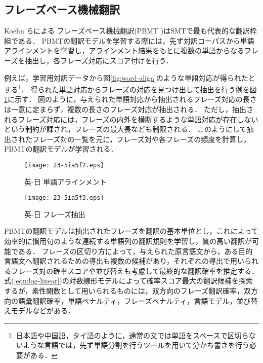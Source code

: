 \documentclass[japanese]{jnlp_1.4}
\begin{document}
\subsection{フレーズベース機械翻訳}
\label{sec:pbmt}

Koehn らによる フレーズベース機械翻訳(PBMT \cite{koehn03})はSMTで最も代表的な翻訳枠組である．
PBMTの翻訳モデルを学習する際には，先ず対訳コーパスから単語アラインメント\cite{brown93}を学習し，アラインメント結果をもとに複数の単語からなるフレーズを抽出し，各フレーズ対応にスコア付けを行う．

例えば，学習用対訳データから図\ref{fig:word-align}のような単語対応が得られたとする\footnote{日本語や中国語，タイ語のように，通常の文では単語をスペースで区切らないような言語では，先ず単語分割を行うツールを用いて分かち書きを行う必要がある．}．
得られた単語対応からフレーズの対応を見つけ出して抽出を行う例を図\ref{fig:phrase-extraction}に示す．
図のように，与えられた単語対応から抽出されるフレーズ対応の長さは一意に定まらず，複数の長さのフレーズ対応が抽出される．
ただし，抽出されるフレーズ対応には，フレーズの内外を横断するような単語対応が存在しないという制約が課され，フレーズの最大長なども制限される．
このようにして抽出されたフレーズ対の一覧を元に，フレーズ対や各フレーズの頻度を計算し，PBMTの翻訳モデルが学習される．

\begin{figure}[b]
\begin{minipage}[b]{0.45\hsize}
\begin{center}
\texttt{[image: 23-5ia5f2.eps]}
\end{center}
\caption{英-日 単語アラインメント}
\label{fig:word-align}
\end{minipage}
\hfill
\begin{minipage}[b]{0.45\hsize}
\begin{center}
\texttt{[image: 23-5ia5f3.eps]}
\end{center}
\caption{英-日 フレーズ抽出}
\label{fig:phrase-extraction}
\end{minipage}
\end{figure}

PBMTの翻訳モデルは抽出されたフレーズを翻訳の基本単位とし，これによって効率的に慣用句のような連続する単語列の翻訳規則を学習し，質の高い翻訳が可能である．
フレーズの区切り方によって，与えられた原言語文から，ある目的言語文へ翻訳されるための導出も複数の候補があり，それぞれの導出で用いられるフレーズ対の確率スコアや並び替えも考慮して最終的な翻訳確率を推定する．
式(\ref{eqn:log-linear})の対数線形モデルによって確率スコア最大の翻訳候補を探索するが，素性関数として用いられるものには，双方向のフレーズ翻訳確率，双方向の語彙翻訳確率，単語ペナルティ，フレーズペナルティ，言語モデル，並び替えモデルなどがある．
\end{document}
